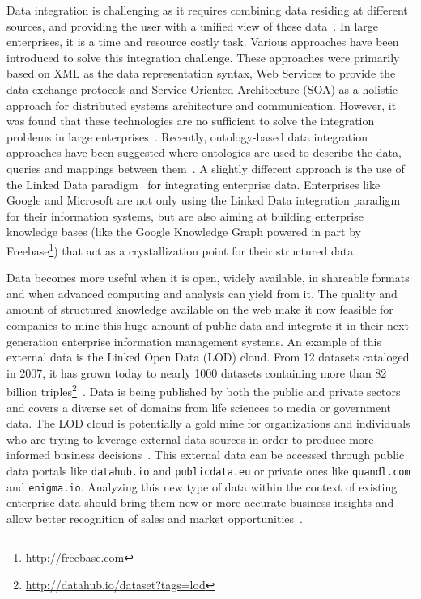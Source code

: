 \documentclass[a4paper,11pt,twoside]{ThesisStyle}
\begin{document}
Data integration is challenging as it requires combining data residing at different sources, and providing the user with a unified view of these data~\cite{Lenzerini:SIGMOD:02}. In large enterprises, it is a time and resource costly task. Various approaches have been introduced to solve this integration challenge. These approaches were primarily based on XML as the data representation syntax, Web Services to provide the data exchange protocols and Service-Oriented Architecture (SOA) as a holistic approach for distributed systems architecture and communication. However, it was found that these technologies are no sufficient to solve the integration problems in large enterprises~\cite{Frischmuth:ISWC:13,Frischmuth:SemWebJorunal:12}. Recently, ontology-based data integration approaches have been suggested where ontologies are used to describe the data, queries and mappings between them~\cite{Wache:IJCAI:01}. A slightly different approach is the use of the Linked Data paradigm~\cite{Bizer:IJSWIS:09} for integrating enterprise data. Enterprises like Google and Microsoft are not only using the Linked Data integration paradigm for their information systems, but are also aiming at building enterprise knowledge bases (like the Google Knowledge Graph powered in part by Freebase\footnote{\url{http://freebase.com}}) that act as a crystallization point for their structured data.

Data becomes more useful when it is open, widely available, in shareable formats and when advanced computing and analysis can yield from it. The quality and amount of structured knowledge available on the web make it now feasible for companies to mine this huge amount of public data and integrate it in their next-generation enterprise information management systems. An example of this external data is the Linked Open Data (LOD) cloud. From 12 datasets cataloged in 2007, it has grown today to nearly 1000 datasets containing more than 82 billion triples\footnote{\url{http://datahub.io/dataset?tags=lod}}~\cite{Bizer:IJSWIS:09}. Data is being published by both the public and private sectors and covers a diverse set of domains from life sciences to media or government data. The LOD cloud is potentially a gold mine for organizations and individuals who are trying to leverage external data sources in order to produce more informed business decisions~\cite{Boyd:Article:11}. This external data can be accessed through public data portals like \texttt{datahub.io} and \texttt{publicdata.eu} or private ones like \texttt{quandl.com} and \texttt{enigma.io}. Analyzing this new type of data within the context of existing enterprise data should bring them new or more accurate business insights and allow better recognition of sales and market opportunities~\cite{LaValle:MIT:11}.
\end{document}
